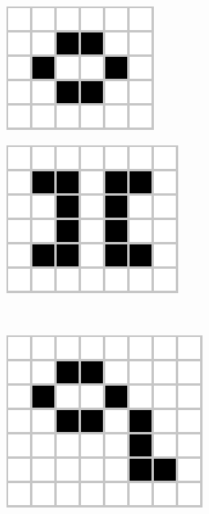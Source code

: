 \documentclass[../proyecto.tex]{memoir}
\begin{document}
\begin{figure}[H]
	\centering
	\begin{subfigure}[b]{0.3\linewidth} 
        \centering
        \includegraphics[height=.45\linewidth]{./images/beehive.png}
        \caption{}
        \label{fig:2-1}
    \end{subfigure}
    \quad
	\begin{subfigure}[b]{0.3\linewidth} 
        \centering
        \includegraphics[height=.5\linewidth]{./images/table_on_table.png}
        \caption{}
        \label{fig:2-2}
    \end{subfigure}
	\\    
    \begin{subfigure}[b]{0.3\linewidth} 
        \centering
        \includegraphics[height=0.5\linewidth]{./images/beehive_with_tail.png}

\end{subfigure}
\end{figure}
\end{document}
